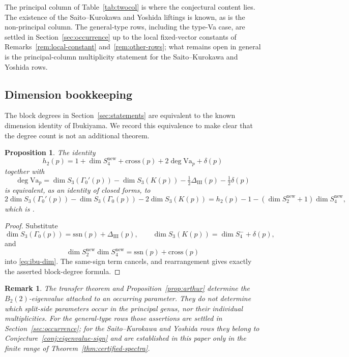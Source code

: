 \documentclass[10pt,a4paper]{amsart}
\newtheorem{proposition}[theorem]{Proposition}
\newtheorem{remark}[theorem]{Remark}
\newcommand{\Va}{\mathrm{Va}}
\newcommand{\snew}{S^{\mathrm{new}}}
\providecommand{\Va}{\mathrm{Va}}
\providecommand{\snew}{S^{\mathrm{new}}}
\begin{document}
	The principal column of Table~\ref{tab:twocol} is where the conjectural
	content lies. The existence of the Saito--Kurokawa and Yoshida liftings is
	known, as is the non-principal column. The general-type rows, including the
	type-Va case, are settled in Section~\ref{sec:occurrence} up to the local
	fixed-vector constants of Remarks~\ref{rem:local-constant}
	and~\ref{rem:other-rows}; what remains open in general is the
	principal-column multiplicity statement for the Saito--Kurokawa and Yoshida
	rows.
	
	\subsection{Dimension bookkeeping}
	\label{ss:dimension-bookkeeping}
	
	The block degrees in Section~\ref{sec:statements} are equivalent to the
	known dimension identity of Ibukiyama. We record this equivalence to make
	clear that the degree count is not an additional theorem.
	
	\begin{proposition}
		\label{prop:VI}
		The identity
		\[
		h_2(p)=1+\dim\snew_4+\mathrm{cross}(p)
		+2\deg\Va_p+\delta(p)
		\]
		together with
		\[
		\deg\Va_p
		=\dim S_3(\Gamma_0'(p))-
		\dim S_3(K(p))-\tfrac12\Delta_{\mathrm{III}}(p)-\tfrac12\delta(p)
		\]
		is equivalent, as an identity of closed forms, to
		\begin{equation}\label{eq:ibu-dim}
			2\dim S_3(\Gamma_0'(p))-
			\dim S_3(\Gamma_0(p))-2\dim S_3(K(p))
			=h_2(p)-1-(\dim\snew_2+1)\dim\snew_4,
		\end{equation}
		which is \cite[Thm.~3.1, $j=0$]{Ibukiyama2018conj}.
	\end{proposition}
	
	\begin{proof}
		Substitute
		\[
		\dim S_3(\Gamma_0(p))=\mathrm{ssn}(p)+\Delta_{\mathrm{III}}(p),
		\qquad
		\dim S_3(K(p))=\dim S_4^-+\delta(p),
		\]
		and
		\[
		\dim\snew_2\dim\snew_4
		=\mathrm{ssn}(p)+\mathrm{cross}(p)
		\]
		into \eqref{eq:ibu-dim}. The same-sign term cancels, and rearrangement
		gives exactly the asserted block-degree formula.
	\end{proof}
	
	\begin{remark}
		\label{rem:transfer-scope}
		The transfer theorem and Proposition~\ref{prop:arthur} determine the
		$B_2(2)$-eigenvalue attached to an occurring parameter. They do not
		determine which split-side parameters occur in the principal genus, nor
		their individual multiplicities. For the general-type rows those assertions are settled in
		Section~\ref{sec:occurrence}; for the Saito--Kurokawa and Yoshida rows
		they belong to Conjecture~\ref{conj:eigenvalue-sign} and are
		established in this paper only in the finite range of
		Theorem~\ref{thm:certified-spectra}.
	\end{remark}
	
\end{document}
